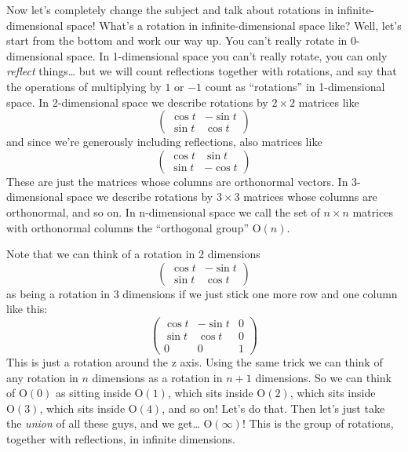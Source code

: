 \documentclass{article}
\begin{document}
Now let's completely change the subject and talk about rotations in
infinite-dimensional space! What's a rotation in infinite-dimensional
space like? Well, let's start from the bottom and work our way up. You
can't really rotate in 0-dimensional space. In 1-dimensional space you
can't really rotate, you can only \emph{reflect} things\ldots{} but we
will count reflections together with rotations, and say that the
operations of multiplying by \(1\) or \(-1\) count as ``rotations'' in
1-dimensional space. In 2-dimensional space we describe rotations by
\(2\times2\) matrices like \[
  \left(
    \begin{array}{cc}
      \cos t & -\sin t
    \\\sin t & \cos t
    \end{array}
  \right)
\] and since we're generously including reflections, also matrices like
\[
  \left(
    \begin{array}{cc}
      \cos t & \sin t
    \\\sin t & -\cos t
    \end{array}
  \right)
\] These are just the matrices whose columns are orthonormal vectors. In
3-dimensional space we describe rotations by \(3\times3\) matrices whose
columns are orthonormal, and so on. In n-dimensional space we call the
set of \(n\times n\) matrices with orthonormal columns the ``orthogonal
group'' \(\mathrm{O}(n)\).

Note that we can think of a rotation in 2 dimensions \[
  \left(
    \begin{array}{cc}
      \cos t & -\sin t
    \\\sin t & \cos t
    \end{array}
  \right)
\] as being a rotation in 3 dimensions if we just stick one more row and
one column like this: \[
  \left(
    \begin{array}{ccc}
      \cos t & -\sin t & 0
    \\\sin t & \cos t & 0
    \\ 0 & 0 & 1
    \end{array}
  \right)
\] This is just a rotation around the z axis. Using the same trick we
can think of any rotation in \(n\) dimensions as a rotation in \(n+1\)
dimensions. So we can think of \(\mathrm{O}(0)\) as sitting inside
\(\mathrm{O}(1)\), which sits inside \(\mathrm{O}(2)\), which sits
inside \(\mathrm{O}(3)\), which sits inside \(\mathrm{O}(4)\), and so
on! Let's do that. Then let's just take the \emph{union} of all these
guys, and we get\ldots{} \(\mathrm{O}(\infty)\)! This is the group of
rotations, together with reflections, in infinite dimensions.
\end{document}
